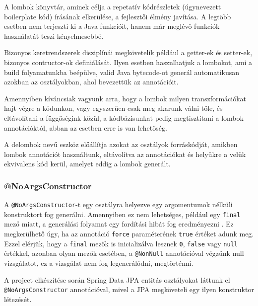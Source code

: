 A lombok könyvtár, aminek célja a repetatív kódrészletek (úgynevezett boilerplate kód) írásának elkerülése, a fejlesztői élmény javítása. A legtöbb esetben nem terjeszti ki a Java funkcióit, hanem már meglévő funkciók használatát teszi kényelmesebbé. \par

Bizonyos keretrendszerek disziplínái megkövetelik például a getter-ek és setter-ek, bizonyos contructor-ok definiálását. Ilyen esetben hasznlhatjuk a lombokot, ami a build folyamatunkba beépülve, valid Java bytecode-ot generál automatikusan azokban az osztályokban, ahol bevezettük az annotációit.\par

Amennyiben kíváncsiak vagyunk arra, hogy a lombok milyen transzformációkat hajt végre a kódunkon, vagy egyszerűen csak meg akarunk válni tőle, és eltávolítani a függőségink közül, a kódbázisunkat pedig megtisztítani a lombok annotációktól, abban az esetben erre is van lehetőség. \par

A delombok nevű eszköz előállítja azokat az osztályok forráskódját, amikben lombok annotációt használtunk, eltávolítva az annotációkat és helyükre a velük ekvivalens kód kerül, amelyet eddig a lombok generált.


\subsubsection{@NoArgsConstructor}

A \lstinline|@NoArgsConstructor|-t egy osztályra helyezve egy argomentumok nélküli konstruktort fog generálni. Amennyiben ez nem lehetséges, például egy \lstinline|final| mező miatt, a generálási folyamat egy fordítási hibát fog eredményezni \cite{lombokConstructorDocumentation}. Ez megkerülhető úgy, ha az annotáció \lstinline|force| paraméterének \lstinline|true| értéket adunk meg. Ezzel elérjük, hogy a \lstinline|final| mezők is inicializálva lesznek \lstinline|0|, \lstinline|false| vagy \lstinline|null| értékkel, azonban olyan mezők esetében, a \lstinline|@NonNull| annotációval végzünk null vizsgálatot, ez a vizsgálat nem fog legenerálódni, megtörténni. 





A project elkészítése során Spring Data JPA entitás osztályokat láttunk el \lstinline|@NoArgsConstructor| annotációval, mivel a JPA megköveteli egy ilyen konstruktor létezését.

